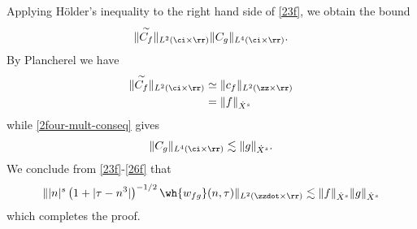 %
Applying H\"{o}lder's inequality to the right hand side of
\eqref{23f}, we obtain the bound
%
\begin{equation}
	\label{24f}
	\begin{split}
		\|\overset{\sim}{C_f} \|_{L^2(\ci \times \rr)} \|C_g \|_{L^4\left( \ci 
		\times \rr 
		\right)}. 
	\end{split}
\end{equation}
%
By Plancherel we have
%
%
\begin{equation}
	\label{25f}
	\begin{split}
		\|\overset{\sim}{C_f} \|_{L^2(\ci \times \rr)}
		& \simeq \|c_f\|_{L^2(\zz \times \rr)}
		\\
		& = \|f \|_{\dot{X}^s}
	\end{split}
\end{equation}
%
while \eqref{2four-mult-conseq} gives
%
%
\begin{equation}
	\label{26f}
	\begin{split}
		\|C_g \|_{L^4(\ci \times \rr)} \lesssim \|g\|_{\dot{X}^s}.
	\end{split}
\end{equation}
%
%
We conclude from \eqref{23f}-\eqref{26f} that
%
%
\begin{equation*}
	\begin{split}
		\| |n|^s \left( 1 + | \tau - n^3 | \right)^{-1/2} \wh{w_{fg}}(n, \tau) 
		 \|_{L^2(\zzdot \times \rr)}
		 \lesssim \|f\|_{\dot{X}^s} \|g\|_{\dot{X}^s}
	\end{split}
\end{equation*}
%
%
which completes the proof.  \qquad \qedsymbol
%
%

